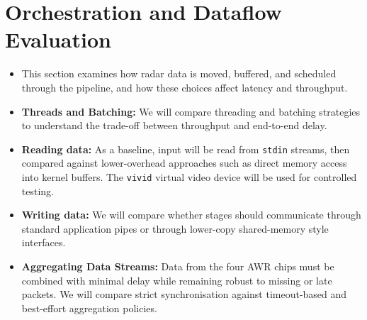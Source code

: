 \section{Orchestration and Dataflow Evaluation}
\label{sec:orchestration}

\begin{itemize}
    \item This section examines how radar data is moved, buffered, and scheduled through the pipeline, and how these choices affect latency and throughput.

    \item \textbf{Threads and Batching:} We will compare threading and batching strategies to understand the trade-off between throughput and end-to-end delay.

    \item \textbf{Reading data:} As a baseline, input will be read from \texttt{stdin} streams, then compared against lower-overhead approaches such as direct memory access into kernel buffers. The \texttt{vivid} virtual video device will be used for controlled testing.

    \item \textbf{Writing data:} We will compare whether stages should communicate through standard application pipes or through lower-copy shared-memory style interfaces.

    \item \textbf{Aggregating Data Streams:} Data from the four AWR chips must be combined with minimal delay while remaining robust to missing or late packets. We will compare strict synchronisation against timeout-based and best-effort aggregation policies.
\end{itemize}